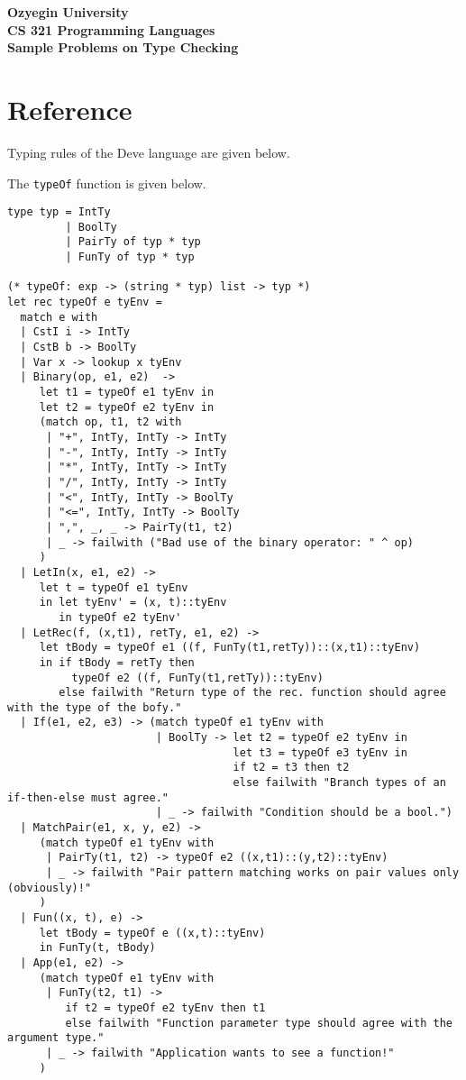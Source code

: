 \documentclass[addpoints]{exam}
\begin{document}
\begin{center}
{\Large \textbf{
    Ozyegin University\\
    CS 321 Programming Languages\\
    Sample Problems on Type Checking
}}
\end{center}

\section*{Reference}
Typing rules of the Deve language are given below.



\newpage
The \texttt{typeOf} function is given below.

{\small
\begin{verbatim}
type typ = IntTy
         | BoolTy
         | PairTy of typ * typ
         | FunTy of typ * typ

(* typeOf: exp -> (string * typ) list -> typ *)
let rec typeOf e tyEnv =
  match e with
  | CstI i -> IntTy
  | CstB b -> BoolTy
  | Var x -> lookup x tyEnv
  | Binary(op, e1, e2)  ->
     let t1 = typeOf e1 tyEnv in
     let t2 = typeOf e2 tyEnv in
     (match op, t1, t2 with
      | "+", IntTy, IntTy -> IntTy
      | "-", IntTy, IntTy -> IntTy
      | "*", IntTy, IntTy -> IntTy
      | "/", IntTy, IntTy -> IntTy
      | "<", IntTy, IntTy -> BoolTy
      | "<=", IntTy, IntTy -> BoolTy
      | ",", _, _ -> PairTy(t1, t2)
      | _ -> failwith ("Bad use of the binary operator: " ^ op)
     )
  | LetIn(x, e1, e2) ->
     let t = typeOf e1 tyEnv
     in let tyEnv' = (x, t)::tyEnv
        in typeOf e2 tyEnv'
  | LetRec(f, (x,t1), retTy, e1, e2) ->
     let tBody = typeOf e1 ((f, FunTy(t1,retTy))::(x,t1)::tyEnv)
     in if tBody = retTy then
          typeOf e2 ((f, FunTy(t1,retTy))::tyEnv)
        else failwith "Return type of the rec. function should agree with the type of the bofy."
  | If(e1, e2, e3) -> (match typeOf e1 tyEnv with
                       | BoolTy -> let t2 = typeOf e2 tyEnv in
                                   let t3 = typeOf e3 tyEnv in
                                   if t2 = t3 then t2
                                   else failwith "Branch types of an if-then-else must agree." 
                       | _ -> failwith "Condition should be a bool.")
  | MatchPair(e1, x, y, e2) ->
     (match typeOf e1 tyEnv with
      | PairTy(t1, t2) -> typeOf e2 ((x,t1)::(y,t2)::tyEnv)
      | _ -> failwith "Pair pattern matching works on pair values only (obviously)!"
     )
  | Fun((x, t), e) ->
     let tBody = typeOf e ((x,t)::tyEnv)
     in FunTy(t, tBody)
  | App(e1, e2) ->
     (match typeOf e1 tyEnv with
      | FunTy(t2, t1) ->
         if t2 = typeOf e2 tyEnv then t1
         else failwith "Function parameter type should agree with the argument type."
      | _ -> failwith "Application wants to see a function!"
     )  
\end{verbatim}
}
\end{document}
